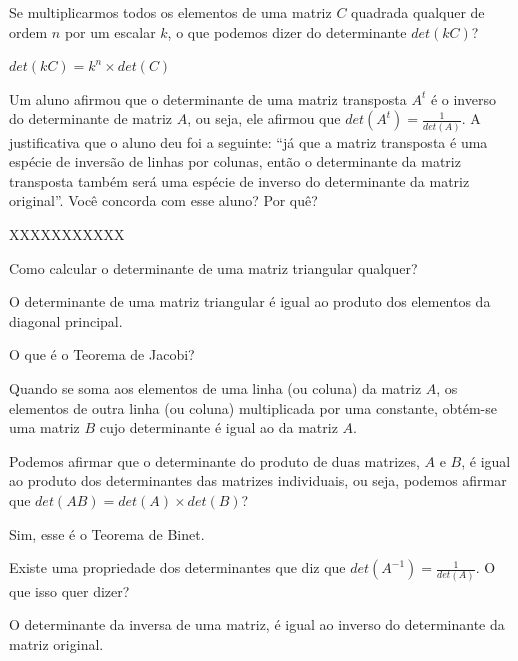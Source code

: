 \documentclass[pdftex, brazil, 12pt, oneside, addpoints]{exam}
\begin{document}
\begin{questions}
\question
Se multiplicarmos todos os elementos de uma matriz $C$ quadrada qualquer
de ordem $n$ por um escalar $k$, o que podemos dizer do determinante
$det(kC)$?
\begin{solutionorlines}[0.50in]
  $det(kC) = k^n \times det(C)$
\end{solutionorlines}

\question
Um aluno afirmou que o determinante de uma matriz transposta $A^t$ é o
inverso do determinante de matriz $A$, ou seja, ele afirmou que
$\displaystyle det(A^t) = \frac{1}{det(A)}$. A justificativa que o aluno deu foi a
seguinte: ``já que a matriz transposta é uma espécie de inversão de
linhas por colunas, então o determinante da matriz transposta também
será uma espécie de inverso do determinante da matriz original''. Você
concorda com esse aluno? Por quê?
\begin{solutionorlines}[0.75in]
  XXXXXXXXXXX
\end{solutionorlines}

\question
Como calcular o determinante de uma matriz triangular qualquer?
\begin{solutionorlines}[0.75in]
  O determinante de uma matriz triangular é igual ao produto dos
  elementos da diagonal principal.
\end{solutionorlines}

\question
O que é o Teorema de Jacobi?
\begin{solutionorlines}[0.75in]
  Quando se soma aos elementos de uma linha (ou coluna) da matriz $A$,
  os elementos de outra linha (ou coluna) multiplicada por uma
  constante, obtém-se uma matriz $B$ cujo determinante é igual ao da
  matriz $A$.
\end{solutionorlines}

\question
Podemos afirmar que o determinante do produto de duas matrizes, $A$ e
$B$, é igual ao produto dos determinantes das matrizes individuais, ou
seja, podemos afirmar que $det(AB) = det(A) \times det(B)$?
\begin{solutionorlines}[0.25in]
  Sim, esse é o Teorema de Binet.
\end{solutionorlines}

\question
Existe uma propriedade dos determinantes que diz que $\displaystyle det(A^{-1}) =
\frac{1}{det(A)}$. O que isso quer dizer?
\begin{solutionorlines}[0.50in]
  O determinante da inversa de uma matriz, é igual ao inverso do
  determinante da matriz original.
\end{solutionorlines}


\end{questions}
\end{document}
